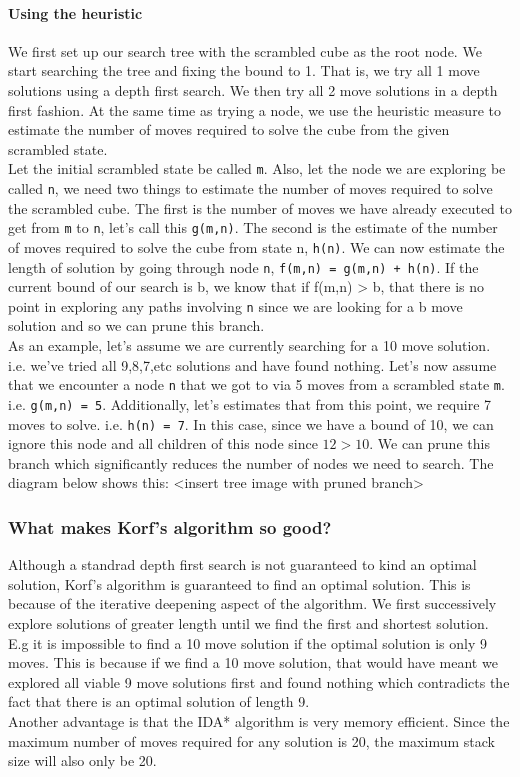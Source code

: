 \documentclass[titlepage]{report}[12pt]
\begin{document}
\paragraph{Using the heuristic}
We first set up our search tree with the scrambled cube as the root node. We start searching the tree and fixing the bound to 1. That is, we try all 1 move solutions using a depth first search. We then try all 2 move solutions in a depth first fashion. At the same time as trying a node, we use the heuristic measure to estimate the number of moves required to solve the cube from the given scrambled state. 
\\
\indent
Let the initial scrambled state be called \texttt{m}. Also, let the node we are exploring be called \texttt{n}, we need two things to estimate the number of moves required to solve the scrambled cube. The first is the number of moves we have already executed to get from \texttt{m} to \texttt{n}, let's call this \texttt{g(m,n)}. The second is the estimate of the number of moves required to solve the cube from state n, \texttt{h(n)}. We can now estimate the length of solution by going through node \texttt{n}, \texttt{f(m,n) = g(m,n) + h(n)}. If the current bound of our search is b, we know that if f(m,n) > b, that there is no point in exploring any paths involving \texttt{n} since we are looking for a b move solution and so we can prune this branch.
\\
\indent
As an example, let's assume we are currently searching for a 10 move solution. i.e. we've tried all 9,8,7,etc solutions and have found nothing. Let's now assume that we encounter a node \texttt{n} that we got to via 5 moves from a scrambled state \texttt{m}. i.e. \texttt{g(m,n) = 5}. Additionally, let's estimates that from this point, we require 7 moves to solve. i.e. \texttt{h(n) = 7}. In this case, since we have a bound of 10, we can ignore this node and all children of this node since \begin{math} 12 > 10 \end{math}. We can prune this branch which significantly reduces the number of nodes we need to search. The diagram below shows this: <insert tree image with pruned branch>

\subsubsection{What makes Korf's algorithm so good?}
Although a standrad depth first search is not guaranteed to kind an optimal solution, Korf's algorithm is guaranteed to find an optimal solution. This is because of the iterative deepening aspect of the algorithm. We first  successively explore solutions of greater length until we find the first and shortest solution. E.g it is impossible to find a 10 move solution if the optimal solution is only 9 moves. This is because if we find a 10 move solution, that would have meant we explored all viable 9 move solutions first and found nothing which contradicts the fact that there is an optimal solution of length 9.
\\
\indent Another advantage is that the IDA* algorithm is very memory efficient. Since the maximum number of moves required for any solution is 20, the maximum stack size will also only be 20.
\end{document}
